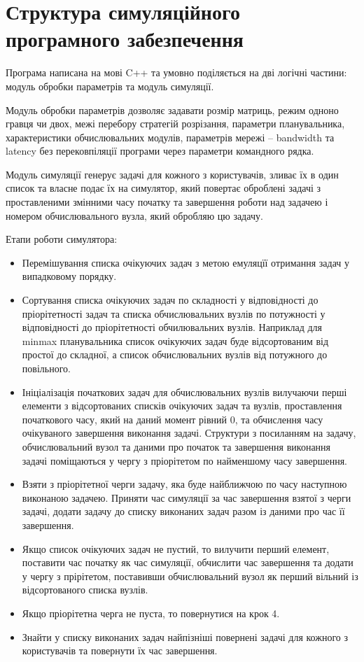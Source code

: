
\section{Структура симуляційного програмного забезпечення}

Програма написана   на мові C++ та умовно поділяється на дві логічні частини: модуль обробки параметрів та модуль симуляції.

Модуль обробки параметрів дозволяє задавати розмір матриць, режим одноно гравця чи двох, межі перебору стратегій розрізання, параметри планувальника, характеристики обчислювальних модулів, параметрів мережі – bandwidth та latency без перековпіляції програми через параметри командного рядка.

Модуль симуляції генерує задачі для кожного з користувачів, зливає їх в один список та власне подає їх на симулятор, який повертає оброблені задачі з проставленими змінними часу початку та завершення роботи над задачею і номером обчислювального вузла, який обробляю цю  задачу.

Етапи роботи симулятора:
\begin{itemize}
	\item Перемішування списка очікуючих задач з метою емуляцїї отримання задач у випадковому порядку.
	
	\item Сортування списка очікуючих задач по складності у відповідності до пріорітетності задач та списка обчислювальних вузлів по потужності у відповідності до пріорітетності обчилювальних вузлів. Наприклад для minmax планувальника список очікуючих задач буде відсортованим від простої до складної, а список обчислювальних вузлів від потужного до повільного.
	
	\item Ініціалізація початкових задач для обчислювальних вузлів вилучаючи перші елементи з  відсортованих списків очікуючих задач та вузлів, проставлення початкового часу, який на даний момент рівний 0, та обчислення часу очікуваного завершення виконання задачі. Структури з посиланням на задачу, обчислювальний вузол та даними про початок та завершення виконання задачі поміщаються у чергу з пріорітетом по найменшому часу завершення.
	
	\item Взяти з пріорітетної черги задачу, яка буде найближчою по часу наступною виконаною задачею. Приняти час симуляції за час завершення взятої з черги задачі, додати задачу до списку виконаних задач разом із даними про час її завершення.
	
	\item Якщо список очікуючих задач не пустий, то вилучити перший елемент, поставити час початку як час симуляції, обчислити час завершення та додати у чергу з прірітетом, поставивши обчислювальний вузол як перший вільний із відсортованого списка вузлів.
	
	\item Якщо пріорітетна черга не пуста, то повернутися на крок 4.
	
	\item Знайти у списку виконаних задач найпізніші повернені задачі для кожного з користувачів та повернути їх час завершення.
\end{itemize}
